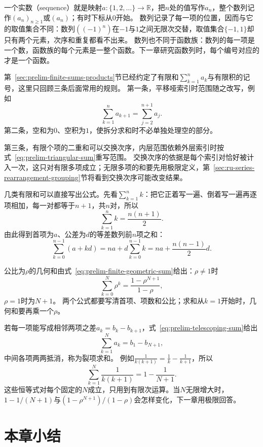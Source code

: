 一个实数（sequence）就是映射$a:\{1,2,\ldots\}\to\mathbb R$，把$n$处的值写作$a_n$，整个数列记作$(a_n)_{n\geq1}$或$(a_n)$；有时下标从$0$开始。
数列记录了每一项的位置，因而与它的取值集合不同：数列$((-1)^n)$在$-1$与$1$之间无限次交替，取值集合$\{-1,1\}$却只有两个元素，次序和重复都看不出来。
数列也不同于函数族：数列的每一项是一个数，函数族的每个元素是一整个函数。下一章研究函数列时，每个编号对应的才是一个函数。

第~\ref{sec:prelim-finite-sums-products}节已经约定了有限和$\sum_{k=1}^na_k$与有限积的记号，这里只回顾三条后面常用的规则。
第一条，平移哑索引时范围随之改写，例如
\[
 \sum_{k=1}^{n}a_{k+1}=\sum_{j=2}^{n+1}a_j.
\]
第二条，空和为$0$、空积为$1$，使拆分求和时不必单独处理空的部分。

第三条，有限个项的二重和可以交换次序，内层范围依赖外层索引时按式~\eqref{eq:prelim-triangular-sum}重写范围。
交换次序的依据是每个索引对恰好被计入一次，这只对有限多项成立；无限多项的和要先用极限定义，第~\ref{sec:ru-series-rearrangement-grouping}节将看到交换次序可能改变结果。

几类有限和可以直接写出公式。先看$\sum_{k=1}^nk$：把它正着写一遍、倒着写一遍再逐项相加，每一对都等于$n+1$，共$n$对，所以
\begin{equation}
 \sum_{k=1}^nk=\frac{n(n+1)}2.
 \label{eq:ru-sum-of-integers}
\end{equation}
由此得到首项为$a$、公差为$d$的等差数列前$n$项之和：
\begin{equation}
 \sum_{k=0}^{n-1}(a+kd)=na+d\sum_{k=0}^{n-1}k=na+\frac{n(n-1)}2d.
 \label{eq:ru-arithmetic-sum}
\end{equation}

公比为$\rho$的几何和由式~\eqref{eq:prelim-finite-geometric-sum}给出：$\rho\neq1$时
\[
 \sum_{k=0}^N\rho^k=\frac{1-\rho^{N+1}}{1-\rho},
\]
$\rho=1$时为$N+1$。
两个公式都要写清首项、项数和公比；求和从$k=1$开始时，几何和要再乘一个$\rho$。

若每一项能写成相邻两项之差$a_k=b_k-b_{k+1}$，式~\eqref{eq:prelim-telescoping-sum}给出
\[
 \sum_{k=1}^Na_k=b_1-b_{N+1},
\]
中间各项两两抵消，称为裂项求和。
例如$\frac1{k(k+1)}=\frac1k-\frac1{k+1}$，所以
\[
 \sum_{k=1}^N\frac1{k(k+1)}=1-\frac1{N+1}.
\]
这些恒等式对每个固定的$N$成立，只用到有限次运算。当$N$无限增大时，$1-1/(N+1)$与$(1-\rho^{N+1})/(1-\rho)$会怎样变化，下一章用极限回答。

\FloatBarrier
\section{本章小结}
\label{sec:real-complex-functions-summary}

